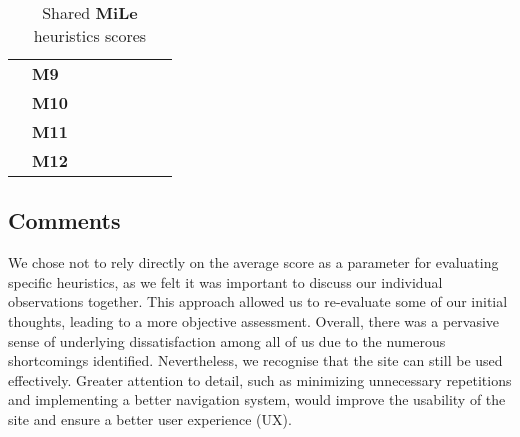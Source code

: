 \begin{table}[htp!]
\begin{tabular}{ |c|l|c|c|c|c|c|c| }
        \cline{2-8}
        & \textbf{M9} & \textbf{\color{unicefGreen}{4}} & \textbf{\color{unicefGreen}{4}} & \textbf{\color{unicefGreen}{4.5}} & \textbf{\color{unicefGreen}{5}} & \textbf{\color{unicefGreen}{4.375}} & \textbf{\color{unicefGreen}{4.5}}\\
        \cline{2-8}
        & \textbf{M10} & \textbf{\color{unicefGreen}{4}} & \textbf{\color{unicefOrange}{3}} & \textbf{\color{unicefGreen}{4.5}} & \textbf{\color{unicefGreen}{4}} & \textbf{\color{unicefOrange}{3.875}} & \textbf{\color{unicefGreen}{4}}\\
        \cline{2-8}
        & \textbf{M11} & \textbf{\color{unicefGreen}{4}} & \textbf{\color{unicefGreen}{4}} & \textbf{\color{unicefGreen}{4}} & \textbf{\color{unicefGreen}{4}} & \textbf{\color{unicefGreen}{4}} & \textbf{\color{unicefGreen}{4}}\\
        \cline{2-8}
        & \textbf{M12} & \textbf{\color{unicefGreen}{5}} & \textbf{\color{unicefGreen}{5}} & \textbf{\color{unicefGreen}{5}} & \textbf{\color{unicefGreen}{5}} & \textbf{\color{unicefGreen}{5}} & \textbf{\color{unicefGreen}{5}}\\
        \hline
    \end{tabular}
    \caption{Shared \textbf{MiLe} heuristics scores}
\end{table}
\newpage
\subsection{Comments}
We chose not to rely directly on the average score as a parameter for evaluating specific heuristics, as we felt it was important to discuss our individual observations together. 
This approach allowed us to re-evaluate some of our initial thoughts, leading to a more objective assessment. 
Overall, there was a pervasive sense of underlying dissatisfaction among all of us due to the numerous shortcomings identified. 
Nevertheless, we recognise that the site can still be used effectively. 
Greater attention to detail, such as minimizing unnecessary repetitions and implementing a better navigation system, would improve the usability of the site and ensure a better user experience (UX).